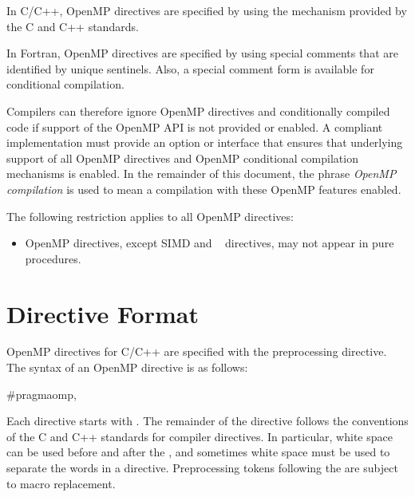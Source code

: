 \ccppspecificstart
In C/C++, OpenMP directives are specified by using the  mechanism provided 
by the C and C++ standards. 
\ccppspecificend

\fortranspecificstart
In Fortran, OpenMP directives are specified by using special comments that are 
identified by unique sentinels. Also, a special comment form is available for conditional 
compilation. 
\fortranspecificend

Compilers can therefore ignore OpenMP directives and conditionally compiled code if 
support of the OpenMP API is not provided or enabled. A compliant implementation 
must provide an option or interface that ensures that underlying support of all OpenMP 
directives and OpenMP conditional compilation mechanisms is enabled. In the 
remainder of this document, the phrase \emph{OpenMP compilation} is used to mean a 
compilation with these OpenMP features enabled.

\begin{samepage}
\fortranspecificstart
\restrictions
The following restriction applies to all OpenMP directives: 
\begin{itemize}
\item OpenMP directives, except SIMD and ~ directives,
 may not appear in pure procedures.
\end{itemize}
\fortranspecificend
\end{samepage}








\section{Directive Format}
\label{sec:Directive Format}
\ccppspecificstart
OpenMP directives for C/C++ are specified with the  preprocessing directive. 
The syntax of an OpenMP directive is as follows:

\begin{boxedcode}
\#pragma\plc{ }omp\plc{ directive-name [clause[ [},\plc{] clause] ... ] new-line}
\end{boxedcode}

Each directive  starts with  . The remainder of the directive follows the 
conventions of the C and C++ standards for compiler directives. In particular, white 
space can be used before and after the \code{\#}, and sometimes white space must be used to 
separate the words in a directive. Preprocessing tokens following the  
are subject to macro replacement. 


